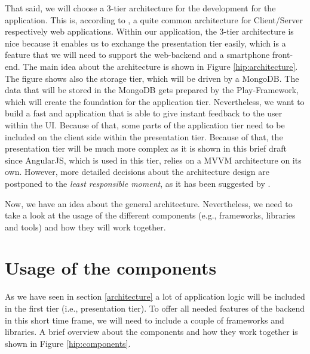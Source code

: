 That said, we will choose a 3-tier architecture for the development for the application. This is, according to \cite{Eckerson1995}, a quite common architecture for Client/Server respectively web applications. Within our application, the 3-tier architecture is nice because it enables us to exchange the presentation tier easily, which is a feature that we will need to support the web-backend and a smartphone front-end. The main idea about the architecture is shown in Figure \ref{hip:architecture}. The figure shows also the storage tier, which will be driven by a MongoDB. The data that will be stored in the MongoDB gets prepared by the Play-Framework, which will create the foundation for the application tier. Nevertheless, we want to build a fast and application that is able to give instant feedback to the user within the \ac{UI}. Because of that, some parts of the application tier need to be included on the client side within the presentation tier. Because of that, the presentation tier will be much more complex as it is shown in this brief draft since AngularJS, which is used in this tier, relies on a \ac{MVVM} architecture on its own.
However, more detailed decisions about the architecture design are postponed to the \textit{least responsible moment}, as it has been suggested by \cite{Mast2013}.

Now, we have an idea about the general architecture. Nevertheless, we need to take a look at the usage of the different components (e.g., frameworks, libraries and tools) and how they will work together.

\section{Usage of the components}
As we have seen in section \ref{architecture} a lot of application logic will be included in the first tier (i.e., presentation tier). To offer all needed features of the backend in this short time frame, we will need to include a couple of frameworks and libraries. A brief overview about the components and how they work together is shown in Figure \ref{hip:components}. 

